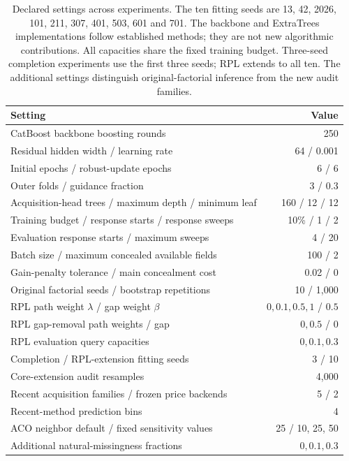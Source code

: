 \documentclass[11pt]{article}
\begin{document}
\begin{table}[htbp]\centering\small
\begin{tabular}{lr}\toprule
Setting & Value\\\midrule
CatBoost backbone boosting rounds ~\cite{catboost} & 250\\
Residual hidden width / learning rate & 64 / 0.001\\
Initial epochs / robust-update epochs & 6 / 6\\
Outer folds / guidance fraction & 3 / 0.3\\
Acquisition-head trees / maximum depth / minimum leaf & 160 / 12 / 12\\
Training budget / response starts / response sweeps & 10\% / 1 / 2\\
Evaluation response starts / maximum sweeps & 4 / 20\\
Batch size / maximum concealed available fields & 100 / 2\\
Gain-penalty tolerance / main concealment cost & 0.02 / 0\\
Original factorial seeds / bootstrap repetitions & 10 / 1,000\\
RPL path weight $\lambda$ / gap weight $\beta$ & $0,0.1,0.5,1$ / $0.5$\\
RPL gap-removal path weights / gap & $0,0.5$ / $0$\\
RPL evaluation query capacities & $0,0.1,0.3$\\
Completion / RPL-extension fitting seeds & 3 / 10\\
Core-extension audit resamples & 4,000\\
Recent acquisition families / frozen price backends & 5 / 2\\
Recent-method prediction bins & 4\\
ACO neighbor default / fixed sensitivity values & 25 / 10, 25, 50\\
Additional natural-missingness fractions & $0,0.1,0.3$\\\bottomrule
\end{tabular}
\caption{Declared settings across experiments. The ten fitting seeds are
13, 42, 2026, 101, 211, 307, 401, 503, 601 and 701. The backbone and
ExtraTrees implementations follow established methods; they are not new
algorithmic contributions. All capacities share the fixed training budget. Three-seed completion experiments use the first three seeds; RPL extends to all ten. The additional settings distinguish original-factorial inference from the new audit families.}
\label{tab:settings}\end{table}
\end{document}
